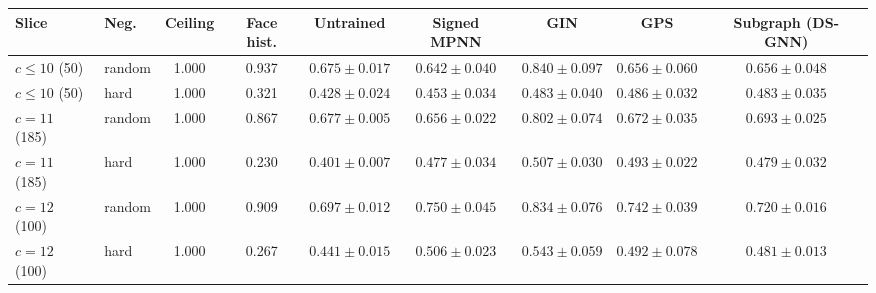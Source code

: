 \begin{tabular}{l l c c c cccc}
\toprule
Slice & Neg. & Ceiling & Face hist. & Untrained & Signed MPNN & GIN & GPS & Subgraph (DS-GNN)\\
\midrule
$c\le10$ (50) & random & 1.000 & 0.937 & $0.675\pm0.017$ & $0.642\pm0.040$ & $0.840\pm0.097$ & $0.656\pm0.060$ & $0.656\pm0.048$\\
$c\le10$ (50) & hard & 1.000 & 0.321 & $0.428\pm0.024$ & $0.453\pm0.034$ & $0.483\pm0.040$ & $0.486\pm0.032$ & $0.483\pm0.035$\\
$c=11$ (185) & random & 1.000 & 0.867 & $0.677\pm0.005$ & $0.656\pm0.022$ & $0.802\pm0.074$ & $0.672\pm0.035$ & $0.693\pm0.025$\\
$c=11$ (185) & hard & 1.000 & 0.230 & $0.401\pm0.007$ & $0.477\pm0.034$ & $0.507\pm0.030$ & $0.493\pm0.022$ & $0.479\pm0.032$\\
$c=12$ (100) & random & 1.000 & 0.909 & $0.697\pm0.012$ & $0.750\pm0.045$ & $0.834\pm0.076$ & $0.742\pm0.039$ & $0.720\pm0.016$\\
$c=12$ (100) & hard & 1.000 & 0.267 & $0.441\pm0.015$ & $0.506\pm0.023$ & $0.543\pm0.059$ & $0.492\pm0.078$ & $0.481\pm0.013$\\
\bottomrule
\end{tabular}

